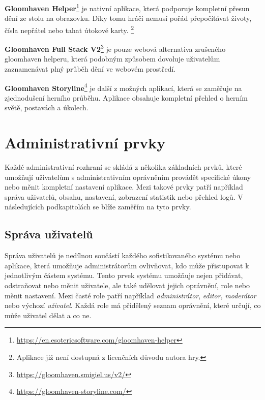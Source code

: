 \begin{description}
    \item \textbf{Gloomhaven Helper}\footnote{\href{https://en.esotericsoftware.com/gloomhaven-helper}{https://en.esotericsoftware.com/gloomhaven-helper}} je nativní aplikace, která podporuje kompletní přesun dění ze stolu na obrazovku. Díky tomu hráči nemusí pořád přepočítávat životy, čísla nepřátel nebo tahat útokové karty. \footnote{Aplikace již není dostupná z licenčních důvodu autora hry.}
    \item \textbf{Gloomhaven Full Stack V2}\footnote{\href{https://gloomhaven.smigiel.us/v2/}{https://gloomhaven.smigiel.us/v2/}} je pouze webová alternativa zrušeného gloomhaven helperu, která podobným způsobem dovoluje uživatelům zaznamenávat plný průběh dění ve webovém prostředí.
    \item \textbf{Gloomhaven Storyline}\footnote{\href{https://gloomhaven-storyline.com/}{https://gloomhaven-storyline.com/}} je další z možných aplikací, která se zaměřuje na zjednodušení herního průběhu. Aplikace obsahuje kompletní přehled o herním světě, postavách a úkolech.
\end{description}

\section{Administrativní prvky}
\label{sec:admin-elements}
Každé administrativní rozhraní se skládá z několika základních prvků, které umožňují uživatelům s administrativním oprávněním provádět specifické úkony nebo měnit kompletní nastavení aplikace. Mezi takové prvky patří například správa uživatelů, obsahu, nastavení, zobrazení statistik nebo přehled logů. V následujících podkapitolách se blíže zaměřím na tyto prvky.

\subsection{Správa uživatelů}
\label{subsec:admin-elements-user-management}
Správa uživatelů je nedílnou součástí každého sofistikovaného systému nebo aplikace, která umožňuje administrátorům ovlivňovat, kdo může přistupovat k jednotlivým částem systému. Tento prvek systému umožňuje nejen přidávat, odstraňovat nebo měnit uživatele, ale také udělovat jejich oprávnění, role nebo měnit nastavení. Mezi časté role patří například \textit{administrátor}, \textit{editor}, \textit{moderátor} nebo výchozí \textit{uživatel}. Každá role má přidělený seznam oprávnění, které určují, co může uživatel dělat a co ne.

